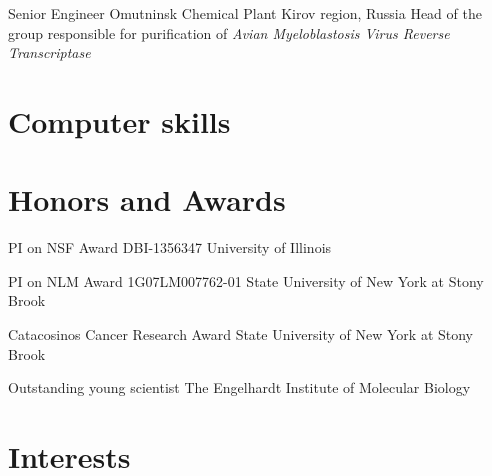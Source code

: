\documentclass[11pt,letterpaper,sans]{moderncv} %
\begin{document}
{Senior Engineer}
{Omutninsk Chemical Plant}
{Kirov region, Russia}
{}
{Head of the group responsible for purification of
  \itshape Avian Myeloblastosis Virus Reverse Transcriptase}


\section{Computer skills}


\newpage
\section{Honors and Awards}

{PI on NSF Award DBI-1356347}
{University of Illinois}

{PI on NLM Award 1G07LM007762-01}
{State University of New York at Stony Brook}

{Catacosinos Cancer Research Award}
{State University of New York at Stony Brook}

{Outstanding young scientist}
{The Engelhardt Institute of Molecular Biology}


\section{Interests}

\renewcommand{\listitemsymbol}{-~} %

\end{document}
